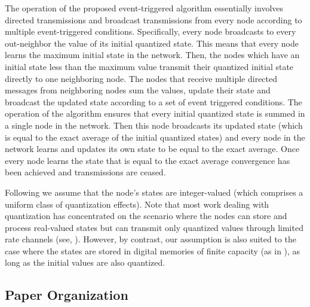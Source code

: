 \documentclass[twocolumn]{autart}    %
\begin{document}
The operation of the proposed event-triggered algorithm essentially involves directed transmissions and broadcast transmissions from every node according to multiple event-triggered conditions. 
Specifically, every node broadcasts to every out-neighbor the value of its initial quantized state. 
This means that every node learns the maximum initial state in the network. 
Then, the nodes which have an initial state less than the maximum value transmit their quantized initial state directly to one neighboring node. 
The nodes that receive multiple directed messages from neighboring nodes sum the values, update their state and broadcast the updated state according to a set of event triggered conditions. 
The operation of the algorithm ensures that every initial quantized state is summed in a single node in the network. 
Then this node broadcasts its updated state (which is equal to the exact average of the initial quantized states) and every node in the network learns and updates its own state to be equal to the exact average. 
Once every node learns the state that is equal to the exact average convergence has been achieved and transmissions are ceased. 

Following \cite{2007:Basar, 2011:Cai_Ishii} we assume that the node's states are integer-valued (which comprises  a uniform class of quantization effects). 
Note that most work dealing with quantization has concentrated on the scenario where the nodes can store and process real-valued states but can transmit only quantized values through limited rate channels (see, \cite{2016:Chamie_Basar}). 
However, by contrast, our assumption is also suited to the case where the states are stored in digital memories of finite capacity (as in \cite{2009:Nedic, 2007:Basar, 2011:Cai_Ishii}), as long as the initial values are also quantized. 


\subsection{Paper Organization}\label{Organization}
\end{document}
